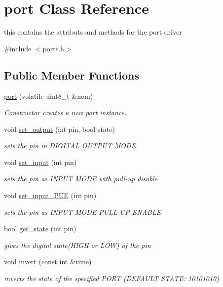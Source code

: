 \hypertarget{classport}{\section{port Class Reference}
\label{classport}
}


this contains the attributs and methods for the port driver  




{\ttfamily \#include $<$ports.\-h$>$}

\subsection*{Public Member Functions}
\begin{DoxyCompactItemize}
\item 
\hyperlink{classport_ac802d7443286c5e9e5b6b18e6d92b803}{port} (volatile uint8\-\_\-t \&nom)
\begin{DoxyCompactList}\small\item\em Constructor creates a new port instance. \end{DoxyCompactList}\item 
void \hyperlink{classport_ac7a0ac9d9d0c29ddcd6561830a1f848a}{set\-\_\-output} (int pin, bool state)
\begin{DoxyCompactList}\small\item\em sets the pin in D\-I\-G\-I\-T\-A\-L O\-U\-T\-P\-U\-T M\-O\-D\-E \end{DoxyCompactList}\item 
void \hyperlink{classport_a55687ade5fe370dcd855c7b8b6242ceb}{set\-\_\-input} (int pin)
\begin{DoxyCompactList}\small\item\em sets the pin as I\-N\-P\-U\-T M\-O\-D\-E with pull-\/up disable \end{DoxyCompactList}\item 
void \hyperlink{classport_afec3e5ae926d7184c273f127c53dd273}{set\-\_\-input\-\_\-\-P\-U\-E} (int pin)
\begin{DoxyCompactList}\small\item\em sets the pin as I\-N\-P\-U\-T M\-O\-D\-E P\-U\-L\-L U\-P E\-N\-A\-B\-L\-E \end{DoxyCompactList}\item 
bool \hyperlink{classport_a375918ab52af1b6791564914147bed0e}{get\-\_\-state} (int pin)
\begin{DoxyCompactList}\small\item\em gives the digital state(\-H\-I\-G\-H or L\-O\-W) of the pin \end{DoxyCompactList}\item 
void \hyperlink{classport_aa0d4a6e02cc7610e5f50a9aa0e1654c2}{invert} (const int \&time)
\begin{DoxyCompactList}\small\item\em inverts the state of the specified P\-O\-R\-T (D\-E\-F\-A\-U\-L\-T S\-T\-A\-T\-E\-: 10101010) \end{DoxyCompactList}\end{DoxyCompactItemize}
